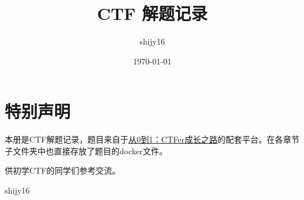 \documentclass[cn,11pt,chinese]{elegantbook}
\title{CTF 解题记录}
\author{shijy16}
\date{\today}
\begin{document}
\maketitle

\chapter*{特别声明}

本册是CTF解题记录，题目来自于\href{https://book.nu1l.com/}{从0到1：CTFer成长之路}的配套平台。在各章节子文件夹中也直接存放了题目的docker文件。

供初学CTF的同学们参考交流。

\vskip 1.5cm

\begin{flushright}
shijy16
\end{flushright}


\tableofcontents
\setcounter{page}{1}



\end{document}
